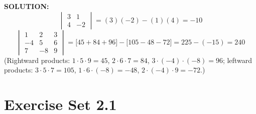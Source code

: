 \documentclass{article}
\theoremstyle{mystyle}
\begin{document}
\textbf{SOLUTION:}
\[
\begin{vmatrix}3&1\\4&-2\end{vmatrix}=(3)(-2)-(1)(4)=-10
\]
\[
\begin{vmatrix}1&2&3\\-4&5&6\\7&-8&9\end{vmatrix}
=\bigl[45+84+96\bigr]-\bigl[105-48-72\bigr]=225-(-15)=\boxed{240}
\]
(Rightward products: $1\cdot5\cdot9=45$, $2\cdot6\cdot7=84$, $3\cdot(-4)\cdot(-8)=96$;
leftward products: $3\cdot5\cdot7=105$, $1\cdot6\cdot(-8)=-48$, $2\cdot(-4)\cdot9=-72$.)

\section*{Exercise Set 2.1}
\end{document}
